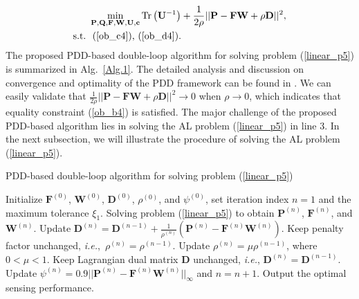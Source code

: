 \documentclass[10pt,journal,twocolumn]{IEEEtran}
\begin{document}
\begin{subequations}\label{linear_p5}
	\begin{align}
&\min_{\mathbf{P},\mathbf{Q},\mathbf{F},\mathbf{W},\mathbf{U},\mathbf{c} } \text{Tr}\left(\mathbf{U}^{-1}\right)+\frac{1}{2\rho}||\mathbf{P}-\mathbf{FW} +\rho\mathbf{D}||^2,\label{ob_a5}\\
	\text{s.t.}~
  &\mbox{ (\ref{ob_c4}),~(\ref{ob_d4})}.\label{ob_d5}
	\end{align}
\end{subequations}
The proposed PDD-based double-loop algorithm for solving
problem (\ref{linear_p5}) is summarized in Alg.~\ref{Alg.1}. The detailed analysis and discussion on convergence and optimality of the PDD framework can be found in \cite{9120361}. We can easily validate that $\frac{1}{2\rho}||\mathbf{P}-\mathbf{FW} +\rho\mathbf{D}||^2\to 0$ when $\rho\to 0$, which indicates that equality constraint (\ref{ob_b4}) is satisfied. The major challenge of the proposed PDD-based algorithm lies in solving the AL problem (\ref{linear_p5}) in line 3. In the next subsection, we will illustrate the procedure of solving the AL problem (\ref{linear_p5}).
\begin{algorithm}[t]
	\caption{PDD-based double-loop algorithm for solving problem (\ref{linear_p5})}
	\begin{algorithmic}[1]\label{Alg.1}
		\STATE Initialize $\mathbf{F}^{(0)}$, $\mathbf{W}^{(0)}$, $\mathbf{D}^{(0)}$, $\rho^{(0)}$, and $\psi^{(0)}$, set iteration index $n=1$ and the maximum tolerance $\xi_1$.
		\STATE  Solving problem (\ref{linear_p5}) to obtain $\mathbf{P}^{(n)}$, $\mathbf{F}^{(n)}$, and $\mathbf{W}^{(n)}$.
		\STATE Update $\mathbf{D}^{(n)}=\mathbf{D}^{(n-1)}+\frac{1}{\rho^{(n)}}\left(\mathbf{P}^{(n)}-\mathbf{F}^{(n)}\mathbf{W}^{(n)}\right)$.
        \STATE Keep penalty factor unchanged, \emph{i.e.},~$\rho^{(n)}=\rho^{(n-1)}$.
        \ELSE
        \STATE Update $\rho^{(n)}=\mu\rho^{(n-1)}$, where $0<\mu<1$.
        \STATE Keep Lagrangian dual matrix $\mathbf{D}$ unchanged, \emph{i.e.}, $\mathbf{D}^{(n)}=\mathbf{D}^{(n-1)}$.
		\ENDIF
        \STATE Update $\psi^{(n)}=0.9||\mathbf{P}^{(n)}-\mathbf{F}^{(n)}\mathbf{W}^{(n)}||_\infty$ and $n=n+1$.
		\ENDWHILE	
		\STATE Output the optimal sensing performance.
	\end{algorithmic}
\end{algorithm}
\end{document}
